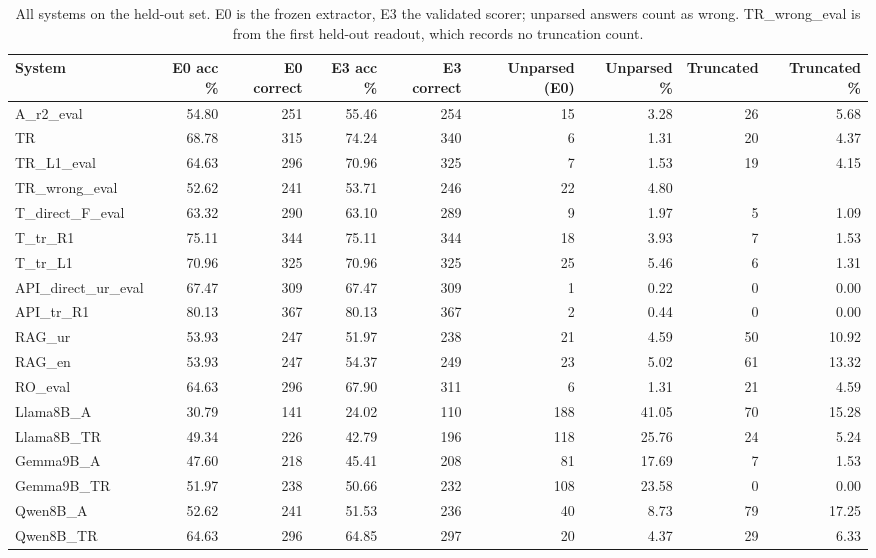 \begin{table}[t]
\centering
\small
\caption{All systems on the held-out set. E0 is the frozen extractor, E3 the validated scorer; unparsed answers count as wrong. TR\_wrong\_eval is from the first held-out readout, which records no truncation count.}
\label{tab:d13-systems}
\begin{tabular}{lrrrrrrrr}
\toprule
System & E0 acc \% & E0 correct & E3 acc \% & E3 correct & Unparsed (E0) & Unparsed \% & Truncated & Truncated \% \\
\midrule
A\_r2\_eval & 54.80 & 251 & 55.46 & 254 & 15 & 3.28 & 26 & 5.68 \\
TR & 68.78 & 315 & 74.24 & 340 & 6 & 1.31 & 20 & 4.37 \\
TR\_L1\_eval & 64.63 & 296 & 70.96 & 325 & 7 & 1.53 & 19 & 4.15 \\
TR\_wrong\_eval & 52.62 & 241 & 53.71 & 246 & 22 & 4.80 &  &  \\
T\_direct\_F\_eval & 63.32 & 290 & 63.10 & 289 & 9 & 1.97 & 5 & 1.09 \\
T\_tr\_R1 & 75.11 & 344 & 75.11 & 344 & 18 & 3.93 & 7 & 1.53 \\
T\_tr\_L1 & 70.96 & 325 & 70.96 & 325 & 25 & 5.46 & 6 & 1.31 \\
API\_direct\_ur\_eval & 67.47 & 309 & 67.47 & 309 & 1 & 0.22 & 0 & 0.00 \\
API\_tr\_R1 & 80.13 & 367 & 80.13 & 367 & 2 & 0.44 & 0 & 0.00 \\
RAG\_ur & 53.93 & 247 & 51.97 & 238 & 21 & 4.59 & 50 & 10.92 \\
RAG\_en & 53.93 & 247 & 54.37 & 249 & 23 & 5.02 & 61 & 13.32 \\
RO\_eval & 64.63 & 296 & 67.90 & 311 & 6 & 1.31 & 21 & 4.59 \\
Llama8B\_A & 30.79 & 141 & 24.02 & 110 & 188 & 41.05 & 70 & 15.28 \\
Llama8B\_TR & 49.34 & 226 & 42.79 & 196 & 118 & 25.76 & 24 & 5.24 \\
Gemma9B\_A & 47.60 & 218 & 45.41 & 208 & 81 & 17.69 & 7 & 1.53 \\
Gemma9B\_TR & 51.97 & 238 & 50.66 & 232 & 108 & 23.58 & 0 & 0.00 \\
Qwen8B\_A & 52.62 & 241 & 51.53 & 236 & 40 & 8.73 & 79 & 17.25 \\
Qwen8B\_TR & 64.63 & 296 & 64.85 & 297 & 20 & 4.37 & 29 & 6.33 \\
\bottomrule
\end{tabular}
\end{table}
